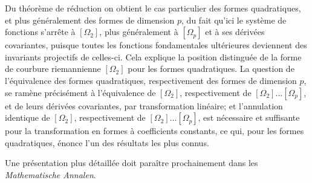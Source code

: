 Du théorème de réduction on obtient le cas particulier des formes quadratiques,
et plus généralement des formes de dimension \(p\), du fait qu'ici le système
de fonctions s'arrête à \([\Omega_2]\), plus généralement à \([\Omega_p]\)
et à ses dérivées covariantes, puisque toutes les fonctions fondamentales
ultérieures deviennent des invariants projectifs de celles-ci. Cela explique
la position distinguée de la forme de courbure riemannienne \([\Omega_2]\)
pour les formes quadratiques. La question de l'équivalence des formes
quadratiques, respectivement des formes de dimension \(p\), se ramène
précisément à l'équivalence de \([\Omega_2]\), respectivement de
\([\Omega_2]\ldots[\Omega_p]\), et de leurs dérivées covariantes, par
transformation linéaire; et l'annulation identique de \([\Omega_2]\),
respectivement de \([\Omega_2]\ldots[\Omega_p]\), est nécessaire et
suffisante pour la transformation en formes à coefficients constants, ce
qui, pour les formes quadratiques, énonce l'un des résultats les plus connus.

Une présentation plus détaillée doit paraître prochainement dans les
\emph{Mathematische Annalen}.
